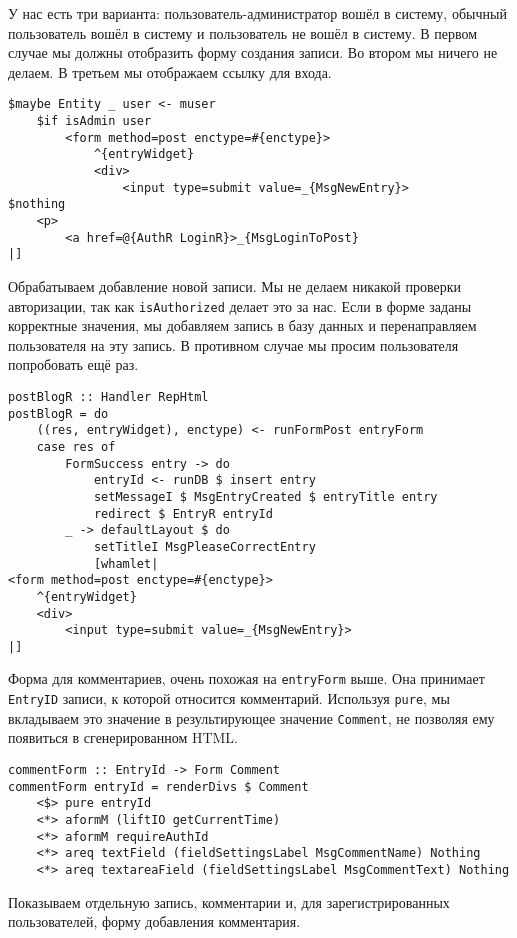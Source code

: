 У нас есть три варианта: пользователь-администратор вошёл в систему, обычный пользователь вошёл в систему и пользователь не вошёл в систему. В первом случае мы должны отобразить форму создания записи. Во втором мы ничего не делаем. В третьем мы отображаем ссылку для входа.

\begin{lstlisting}
$maybe Entity _ user <- muser
    $if isAdmin user
        <form method=post enctype=#{enctype}>
            ^{entryWidget}
            <div>
                <input type=submit value=_{MsgNewEntry}>
$nothing
    <p>
        <a href=@{AuthR LoginR}>_{MsgLoginToPost}
|]
\end{lstlisting}%

Обрабатываем добавление новой записи. Мы не делаем никакой проверки авторизации, так как \lstinline!isAuthorized! делает это за нас. Если в форме заданы корректные значения, мы добавляем запись в базу данных и перенаправляем пользователя на эту запись. В противном случае мы просим пользователя попробовать ещё раз.

\begin{lstlisting}
postBlogR :: Handler RepHtml
postBlogR = do
    ((res, entryWidget), enctype) <- runFormPost entryForm
    case res of
        FormSuccess entry -> do
            entryId <- runDB $ insert entry
            setMessageI $ MsgEntryCreated $ entryTitle entry
            redirect $ EntryR entryId
        _ -> defaultLayout $ do
            setTitleI MsgPleaseCorrectEntry
            [whamlet|
<form method=post enctype=#{enctype}>
    ^{entryWidget}
    <div>
        <input type=submit value=_{MsgNewEntry}>
|]
\end{lstlisting}%

Форма для комментариев, очень похожая на \lstinline!entryForm! выше. Она принимает \lstinline!EntryID! записи, к которой относится комментарий. Используя \lstinline!pure!, мы вкладываем это значение в результирующее значение \lstinline!Comment!, не позволяя ему появиться в сгенерированном HTML.

\begin{lstlisting}
commentForm :: EntryId -> Form Comment
commentForm entryId = renderDivs $ Comment
    <$> pure entryId
    <*> aformM (liftIO getCurrentTime)
    <*> aformM requireAuthId
    <*> areq textField (fieldSettingsLabel MsgCommentName) Nothing
    <*> areq textareaField (fieldSettingsLabel MsgCommentText) Nothing
\end{lstlisting}

Показываем отдельную запись, комментарии и, для зарегистрированных пользователей, форму добавления комментария.

